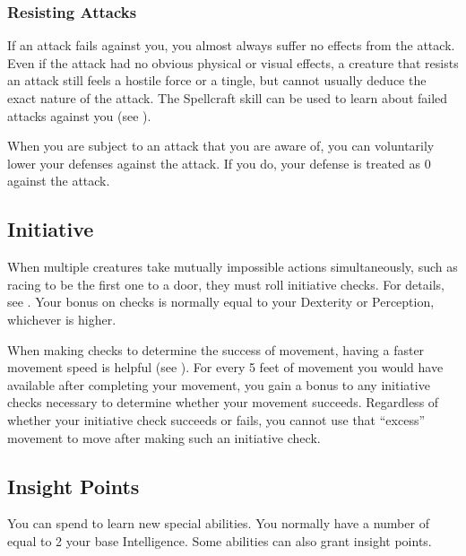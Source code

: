         \subsubsection{Resisting Attacks}
            If an attack fails against you, you almost always suffer no effects from the attack.
            Even if the attack had no obvious physical or visual effects, a creature that resists an attack still feels a hostile force or a tingle, but cannot usually deduce the exact nature of the attack.
            The Spellcraft skill can be used to learn about failed  attacks against you (see ).

             When you are subject to an attack that you are aware of, you can voluntarily lower your defenses against the attack.
            If you do, your defense is treated as 0 against the attack.

    \subsection{Initiative}\label{Initiative}
        When multiple creatures take mutually impossible actions simultaneously, such as racing to be the first one to a door, they must roll initiative checks.
        For details, see .
        Your bonus on  checks is normally equal to your Dexterity or Perception, whichever is higher.

        \label{Movement-Based Initiative}
        When making  checks to determine the success of movement, having a faster movement speed is helpful (see ).
        For every 5 feet of movement you would have available after completing your movement, you gain a  bonus to any initiative checks necessary to determine whether your movement succeeds.
        Regardless of whether your initiative check succeeds or fails, you cannot use that ``excess'' movement to move after making such an initiative check.

    \subsection{Insight Points}\label{Insight Points}
        You can spend  to learn new special abilities.
        You normally have a number of  equal to 2 \add your base Intelligence.
        Some abilities can also grant insight points.

